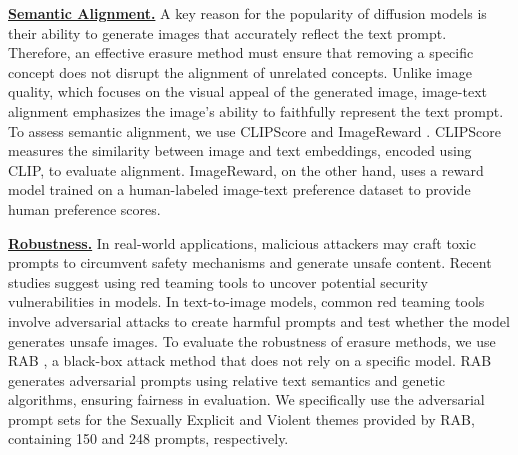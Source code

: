 \noindent \textbf{\uline{Semantic Alignment.}} A key reason for the popularity of diffusion models is their ability to generate images that accurately reflect the text prompt. Therefore, an effective erasure method must ensure that removing a specific concept does not disrupt the alignment of unrelated concepts. Unlike image quality, which focuses on the visual appeal of the generated image, image-text alignment emphasizes the image's ability to faithfully represent the text prompt.
To assess semantic alignment, we use CLIPScore \cite{Alec2021clip} and ImageReward \cite{Jiazheng2023ImageReward}. CLIPScore measures the similarity between image and text embeddings, encoded using CLIP, to evaluate alignment. ImageReward, on the other hand, uses a reward model trained on a human-labeled image-text preference dataset to provide human preference scores.

\noindent \textbf{\uline{Robustness.}}  
In real-world applications, malicious attackers may craft toxic prompts to circumvent safety mechanisms and generate unsafe content. Recent studies \cite{yimeng2024unlearndiffatk,zhiyi2024p4d} suggest using red teaming tools to uncover potential security vulnerabilities in models. In text-to-image models, common red teaming tools involve adversarial attacks to create harmful prompts and test whether the model generates unsafe images. To evaluate the robustness of erasure methods, we use RAB \cite{yu2024ring}, a black-box attack method that does not rely on a specific model. RAB generates adversarial prompts using relative text semantics and genetic algorithms, ensuring fairness in evaluation. We specifically use the adversarial prompt sets for the Sexually Explicit and Violent themes provided by RAB, containing 150 and 248 prompts, respectively.




